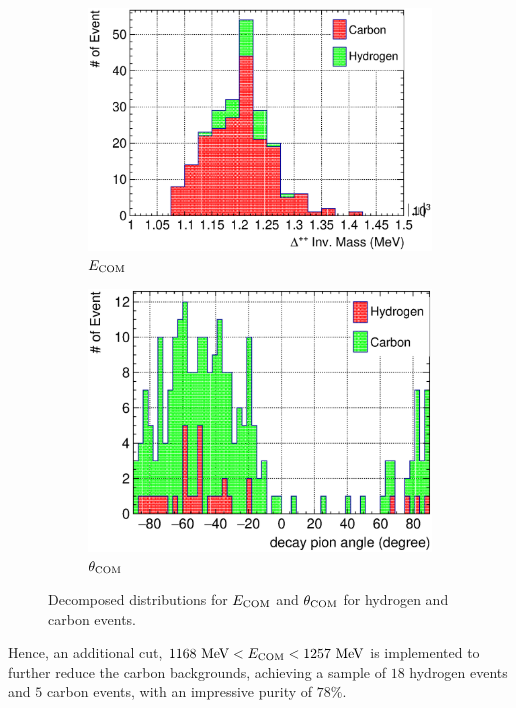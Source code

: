      \begin{figure}
     \begin{subfigure}[b]{\dbfigwid\textwidth}
          \centering
          \includegraphics[width=\textwidth]{figures/perf/tki/SFGpTPCmu_edelta_stack_al14.eps}
          \caption{$E_{\textrm{COM}}$}
          \label{subfig:hsel-com-edelta}
     \end{subfigure}
     \begin{subfigure}[b]{\dbfigwid\textwidth}
          \centering
          \includegraphics[width=\textwidth]{figures/perf/tki/SFGpTPCmu_dang_stack_al15.eps}
          \caption{$\theta_{\textrm{COM}}$}
          \label{subfig:hsel-com-theta}
     \end{subfigure}
     \caption{Decomposed distributions for $E_{\textrm{COM}}$ and $\theta_{\textrm{COM}}$ for hydrogen and carbon events.}
     \label{fig:hsel-com-decomp}
     \end{figure}
     Hence, an additional cut, $1168~\textrm{MeV}<E_{\textrm{COM}}<1257~\textrm{MeV}$ is implemented to further reduce the carbon backgrounds, achieving a sample of $18$ hydrogen events and $5$ carbon events, with an impressive purity of $78\%$.

